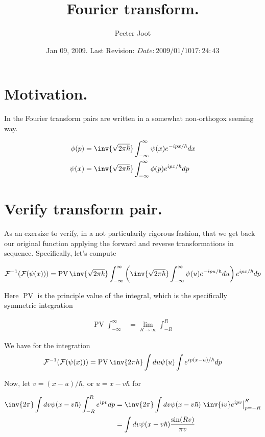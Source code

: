 \documentclass{article}
\title{ Fourier transform. }
\author{Peeter Joot}
\date{ Jan 09, 2009.  Last Revision: $Date: 2009/01/10 17:24:43 $ }
\newcommand{\FF}[0]{\mathcal{F}}
\newcommand{\FM}[0]{\inv{\sqrt{2\pi\hbar}}}
\newcommand{\Iinf}[1]{ \int_{-\infty}^\infty {#1}}
\DeclareMathOperator{\PV}{PV}
\begin{document}
\maketitle{}

\section{ Motivation. }

In \cite{mcmahon2005qmd} the Fourier transform pairs are written in a somewhat 
non-orthogox seeming way.

\begin{align*}
\phi(p) &= \FM \Iinf{\psi(x) e^{-ipx/\hbar} dx} \\
\psi(x) &= \FM \Iinf{\phi(p) e^{ipx/\hbar} dp} \\
\end{align*}

\section{ Verify transform pair. }

As an exersize to verify, in a not particularily rigorous fashion, that we get back our original function applying the forward and reverse transformations
in sequence.  Specifically, let's compute

\begin{align*}
\FF^{-1}(\FF(\psi(x)))
&= \PV \FM \Iinf{\left(\FM \Iinf{\psi(u) e^{-ipu/\hbar} du}\right) e^{ipx/\hbar} dp} \\
\end{align*}

Here $\PV$ is the principle value of the integral, which is the specifically symmetric integration

\begin{align*}
\PV \Iinf{} &= \lim_{R \rightarrow \infty} \int_{-R}^R
\end{align*}

We have for the integration
\begin{align*}
\FF^{-1}(\FF(\psi(x)))
&= \PV \inv{{2\pi\hbar}} \int du \psi(u) \int e^{i p (x-u)/\hbar} dp \\
\end{align*}

Now, let $v = (x-u)/\hbar$, or $u=x-v\hbar$ for

\begin{align*}
\inv{{2\pi}} \int dv \psi(x -v\hbar) \int_{-R}^R e^{i p v} dp 
&= \inv{{2\pi}} \int dv \psi(x - v\hbar) \left. \inv{i v} e^{i p v} \right\vert_{p=-R}^R \\
&= \int dv \psi(x - v\hbar) \frac{\sin(R v)}{\pi v} \\
\end{align*}
\end{document}
